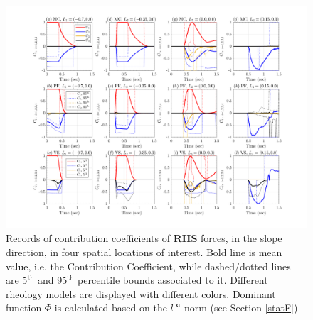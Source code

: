 \documentclass{article}
\begin{document}
\begin{figure}[H]
         \centering
        \includegraphics[width=1\textwidth]{InclinedPlane/ForceContrib/Ci_x.png}
        \caption{Records of contribution coefficients of \textbf{RHS} forces, in the slope direction, in four spatial locations of interest. Bold line is mean value, i.e. the Contribution Coefficient, while dashed/dotted lines are 5$^{\mathrm{th}}$ and 95$^{\mathrm{th}}$ percentile bounds associated to it. Different rheology models are displayed with different colors. Dominant function $\Phi$ is calculated based on the $l^\infty$ norm (see Section \ref{statF})}
        \label{fig:Ramp-Ci_x}
\end{figure}
\end{document}
